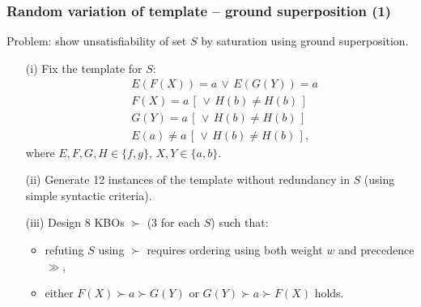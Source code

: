 \documentclass[xcolor={table}]{beamer}
\begin{document}
\begin{frame}
  \frametitle{Random variation of template -- ground superposition (1)}

  Problem: show unsatisfiability of set $S$ by saturation using ground superposition.\\
  \vspace*{0.5em}
  \pause

  \begin{itemize}[<+->]
\item[(i)] Fix the template for $S$:
{\small
\begin{align*}
  &E(F(X)) = a \,\lor\, E(G(Y)) = a \\
  &F(X) = a \,[\, \lor\, H(b) \not= H(b) \,] \\
  &G(Y) = a \,[\, \lor\, H(b) \not= H(b) \,] \\
  &E(a) \not= a \,[\, \lor\, H(b) \not= H(b) \,],
\end{align*}
}
where $E, F, G, H \in \{f, g\}$, $X, Y \in \{a, b\}$.
\item[(ii)] Generate 12 instances of the template without redundancy in $S$
  (using simple syntactic criteria).
\item[(iii)] Design 8 KBOs $\succ$ (3 for each $S$) such that:
  \begin{itemize}
    \item refuting $S$ using $\succ$ requires ordering using both weight $w$ and precedence $\gg$,
    \item either $F(X) \succ a \succ G(Y)$ or $G(Y) \succ a \succ F(X)$ holds.
  \end{itemize}
\end{itemize}

\end{frame}
\end{document}
